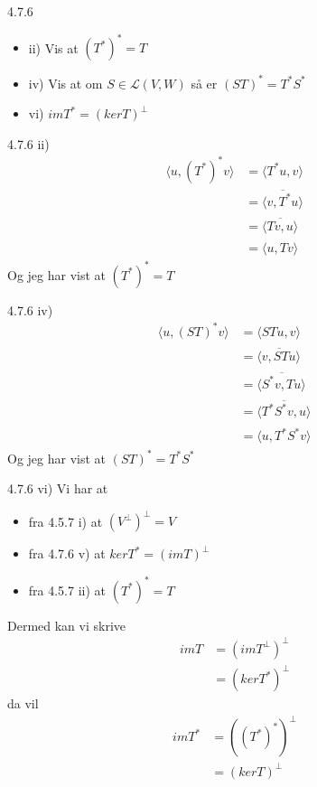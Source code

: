 \documentclass[a4paper,norsk]{article}
\begin{document}
\begin{oppgavebox}{4.7.6}{}

\begin{itemize}
    \item ii) Vis at $ \left( T^* \right) ^*  =T $ 
    \item iv) Vis at om $ S \in \mathcal{L} \left( V, W \right)  $ så er $ \left( ST \right) ^* = T^* S^* $
    \item vi) $ imT^* = \left( ker T \right) ^{\bot} $

\end{itemize}

\begin{proofbox}{4.7.6 ii)}{}
    \begin{align*}
        \langle u, \left( T^* \right) ^* v \rangle_{  } &= \langle T^*u, v \rangle_{  } \\
        &= \overline{ \langle v, T^*u \rangle_{  } } \\
        &= \overline{ \langle Tv, u \rangle_{  }} \\
        &= \langle u, Tv \rangle_{  } 
    \end{align*} 
    Og jeg har vist at $ \left( T^* \right) ^*=T $ 
\end{proofbox}

\begin{proofbox}{4.7.6 iv)}{}
    \begin{align*}
        \langle u, \left( ST \right) ^* v \rangle_{  } &= \langle STu, v \rangle_{  } \\
        &= \overline{ \langle v, STu \rangle_{  } } \\
        &= \overline{ \langle S^* v, Tu \rangle_{  } } \\
        &= \overline{ \langle T^* S^* v, u \rangle_{  } } \\
        &= \langle u, T^* S^* v \rangle_{  } 
    \end{align*}
    Og jeg har vist at $ \left( ST \right) ^* = T^* S^* $ 
\end{proofbox}

\begin{proofbox}{4.7.6 vi)}{}
    Vi har at
    \begin{itemize}
        \item fra 4.5.7 i) at $ \left( V^{\bot} \right)^{\bot} = V  $ 
        \item fra 4.7.6 v) at $ ker T^* = \left( imT \right) ^{\bot} $
        \item fra 4.5.7 ii) at $ \left( T^* \right) ^* = T $   
    \end{itemize} 
    Dermed kan vi skrive 
    \begin{align*}
        imT &= \left( imT^{\bot} \right) ^{\bot} \\
        &= \left( ker T^* \right) ^{\bot}
    \end{align*}
    da vil 
    \begin{align*}
        imT^* &= \left( \left( T^* \right) ^* \right) ^{\bot} \\
        &= \left( kerT \right) ^{\bot}
    \end{align*}
\end{proofbox}
\end{oppgavebox}
\end{document}
